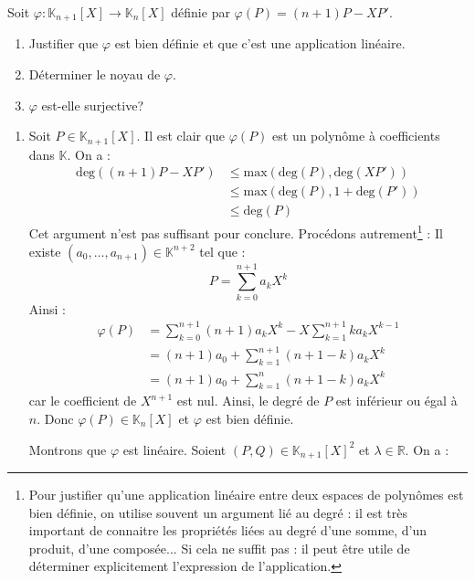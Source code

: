 \documentclass[a4paper,10pt]{report}
\begin{document}
\medskip

\begin{Exa} Soit $\varphi : \mathbb{K}_{n+1}[X]\rightarrow \mathbb{K}_{n}[X]$ définie par $\varphi(P) = (n + 1)P - XP'$.
    \begin{enumerate}
      \item
        Justifier que $\varphi$ est bien définie et que c'est une application linéaire.
      \item
        Déterminer le noyau de $\varphi$.
      \item
        $\varphi$ est-elle surjective?
    \end{enumerate}
\end{Exa}

\corr \begin{enumerate}
\item Soit $P \in \mathbb{K}_{n+1}[X]$. Il est clair que $\varphi(P)$ est un polynôme à coefficients dans $\mathbb{K}$. On a :
\begin{align*}
\textrm{deg}((n+1)P -XP') & \leq  \textrm{max}(\textrm{deg}(P), \textrm{deg}(XP')) \\
& \leq  \textrm{max}(\textrm{deg}(P), 1 +\textrm{deg}(P') ) \\
 &\leq  \textrm{deg}(P) 
\end{align*}
Cet argument n'est pas suffisant pour conclure. Procédons autrement\footnote{Pour justifier qu'une application linéaire entre deux espaces de polynômes est bien définie, on utilise souvent un argument lié au degré : il est très important de connaitre les propriétés liées au degré d'une somme, d'un produit, d'une composée... Si cela ne suffit pas : il peut être utile de déterminer explicitement l'expression de l'application.} : Il existe $(a_0, \ldots, a_{n+1}) \in \mathbb{K}^{n+2}$ tel que :
$$ P = \sum_{k=0}^{n+1} a_k X^k $$
Ainsi :
\begin{align*}
\varphi(P) & = \sum_{k=0}^{n+1} (n+1) a_k X^k - X \sum_{k=1}^{n+1} k a_k X^{k-1}  \\
& = (n+1)a_0  + \sum_{k=1}^{n+1} (n+1-k)a_k X^k  \\
& = (n+1)a_0 + \sum_{k=1}^{n} (n+1-k)a_k X^k  
\end{align*} 
car le coefficient de $X^{n+1}$ est nul. Ainsi, le degré de $P$ est inférieur ou égal à $n$. Donc $\varphi(P) \in \mathbb{K}_n[X]$ et $\varphi$ est bien définie.

\medskip

\noindent Montrons que $\varphi$ est linéaire. Soient $(P,Q) \in \mathbb{K}_{n+1}[X]^2$ et $\lambda \in \mathbb{R}$. On a :


\end{enumerate}
\end{document}
